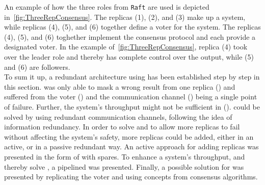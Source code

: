 An example of how the three roles from \texttt{Raft} are used is depicted in~\autoref{fig:ThreeRepConsensus}.
The replicas (1), (2), and (3) make up a  system, while replicas (4), (5), and (6) together define a voter for the system.
The replicas (4), (5), and (6) toghether implement the consensus protocol and each provide a designated voter.
In the example of~\autoref{fig:ThreeRepConsensus}, replica (4) took over the leader role and thereby has complete control over the output, while (5) and (6) are followers.
\\

To sum it up, a redundant architecture using  has been established step by step in this section.
 was only able to mask a wrong result from one replica (\ChallengeWR) and suffered from the voter (\ChallengeVoter) and the communication channel (\ChallengeComm) being a single point of failure.
Further, the system's throughput might not be sufficient in  (\ChallengeThrough).
\ChallengeComm could be solved by using redundant communication channels, following the idea of information redundancy.
In order to solve \ChallengeWR and to allow more replicas to fail without affecting the system's safety, more replicas could be added, either in an active, or in a passive redundant way.
An active approach for adding replicas was presented in the form of  with spares.
To enhance a system's throughput, and thereby solve \ChallengeThrough, a pipelined  was presented.
Finally, a possible solution for \ChallengeVoter was presented by replicating the voter and using concepts from consensus algorithms.